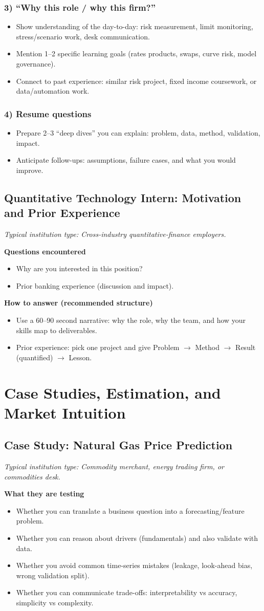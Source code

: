\documentclass[11pt,letterpaper,openany]{book}
\newcommand{\RoleProfile}[2]{%
  \subsection{#1}%
  \noindent\textit{Typical institution type: #2.}\par
}
\newcommand{\prompt}[1]{\subsubsection*{#1}}
\begin{document}
\prompt{3) ``Why this role / why this firm?''}
\begin{itemize}
  \item Show understanding of the day-to-day: risk measurement, limit monitoring, stress/scenario work, desk communication.
  \item Mention 1--2 specific learning goals (rates products, swaps, curve risk, model governance).
  \item Connect to past experience: similar risk project, fixed income coursework, or data/automation work.
\end{itemize}

\prompt{4) Resume questions}
\begin{itemize}
  \item Prepare 2--3 ``deep dives'' you can explain: problem, data, method, validation, impact.
  \item Anticipate follow-ups: assumptions, failure cases, and what you would improve.
\end{itemize}

\RoleProfile{Quantitative Technology Intern: Motivation and Prior Experience}{Cross-industry quantitative-finance employers}
\textbf{Questions encountered}
\begin{itemize}
  \item Why are you interested in this position?
  \item Prior banking experience (discussion and impact).
\end{itemize}

\textbf{How to answer (recommended structure)}
\begin{itemize}
  \item Use a 60--90 second narrative: why the role, why the team, and how your skills map to deliverables.
  \item Prior experience: pick one project and give Problem $\to$ Method $\to$ Result (quantified) $\to$ Lesson.
\end{itemize}

\section{Case Studies, Estimation, and Market Intuition}

\RoleProfile{Case Study: Natural Gas Price Prediction}{Commodity merchant, energy trading firm, or commodities desk}
\textbf{What they are testing}
\begin{itemize}
  \item Whether you can translate a business question into a forecasting/feature problem.
  \item Whether you can reason about drivers (fundamentals) and also validate with data.
  \item Whether you avoid common time-series mistakes (leakage, look-ahead bias, wrong validation split).
  \item Whether you can communicate trade-offs: interpretability vs accuracy, simplicity vs complexity.
\end{itemize}
\end{document}
